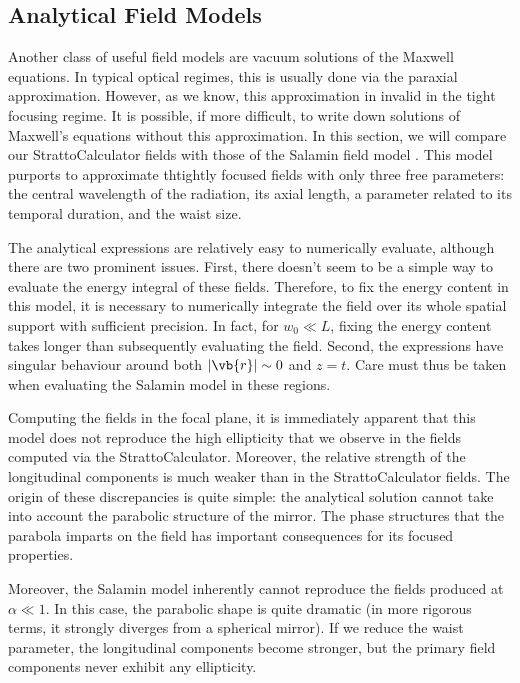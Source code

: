 \documentclass[11pt,SymmetricalJury]{inrsthesis/inrsthesis}
\begin{document}
\subsection{Analytical Field Models}

Another class of useful field models are vacuum solutions of the Maxwell equations.
In typical optical regimes, this is usually done via the paraxial approximation.
However, as we know, this approximation in invalid in the tight focusing regime.
It is possible, if more difficult, to write down solutions of Maxwell's equations
without this approximation. In this section, we will compare our StrattoCalculator
fields with those of the Salamin field model \cite{Salamin2015b}. This model purports to approximate
thtightly focused fields with only three free parameters: the central wavelength
of the radiation, its axial length, a parameter related to its temporal duration,
and the waist size.

The analytical expressions are relatively easy to numerically evaluate, although
there are two prominent issues. First, there doesn't seem to be a simple way
to evaluate the energy integral of these fields. Therefore, to fix the energy
content in this model, it is necessary to numerically integrate the field
over its whole spatial support with sufficient precision. In fact, for $w_0\ll L$,
fixing the energy content takes longer than subsequently evaluating the field.
Second, the expressions have singular behaviour around both $|\vb{r}|\sim0$ and $z=t$. Care must thus
be taken when evaluating the Salamin model in these regions.

Computing the fields in the focal plane, it is immediately apparent that this
model does not reproduce the high ellipticity that we observe in the fields
computed via the StrattoCalculator. Moreover, the relative strength of the
longitudinal components is much weaker than in the StrattoCalculator fields.
The origin of these discrepancies is quite simple: the analytical solution
cannot take into account the parabolic structure of the mirror. The phase
structures that the parabola imparts on the field has important consequences for
its focused properties.

Moreover, the Salamin model inherently cannot reproduce the fields produced
at $\alpha\ll1$. In this case, the parabolic shape is quite dramatic (in
more rigorous terms, it strongly diverges from a spherical mirror).
If we reduce the waist parameter, the longitudinal components become stronger,
but the primary field components never exhibit any ellipticity.
\end{document}
